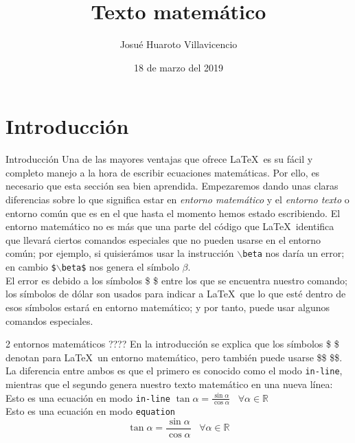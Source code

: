 \documentclass{beamer}
\institute{\vskip1ex Facultad de Ingeniería Mecánica\\ \vskip-1ex Universidad Nacional de Ingeniería}
\title{\huge Texto matemático}
\author[HeNeos]{\large Josué Huaroto Villavicencio}
\date{\tiny 18 de marzo del 2019}
\begin{document}
\begin{frame}
\maketitle
\end{frame}
\section{Introducción}
\begin{frame}{Introducción}
Una de las mayores ventajas que ofrece \LaTeX\, es su fácil y completo manejo a la hora de escribir ecuaciones matemáticas. Por ello, es necesario que esta sección sea bien aprendida. Empezaremos dando unas claras diferencias sobre lo que significa estar en \textit{entorno matemático} y el \textit{entorno texto} o entorno común que es en el que hasta el momento hemos estado escribiendo. El entorno matemático no es más que una parte del código que \LaTeX\, identifica que llevará ciertos comandos especiales que no pueden usarse en el entorno común; por ejemplo, si quisierámos usar la instrucción \texttt{$\backslash$beta} nos daría un error; en cambio \texttt{\$$\backslash$beta\$} nos genera el símbolo $\beta$.\\
El error es debido a los símbolos \$ \$ entre los que se encuentra nuestro comando; los símbolos de dólar son usados para indicar a \LaTeX\, que lo que esté dentro de esos símbolos estará en entorno matemático; y por tanto, puede usar algunos comandos especiales.
\end{frame}
\begin{frame}{2 entornos matemáticos ????}
En la introducción se explica que los símbolos \$ \$ denotan para \LaTeX\, un entorno matemático, pero también puede usarse \$\$ \$\$. La diferencia entre ambos es que el primero es conocido como el modo \texttt{in-line}, mientras que el segundo genera nuestro texto matemático en una nueva línea:\\[20pt]
Esto es una ecuación en modo \texttt{in-line} $\tan \alpha = \frac{\sin \alpha}{\cos \alpha} \;\;\; \forall \alpha \in \mathbb{R} $\\[20pt]
Esto es una ecuación en modo \texttt{equation}
$$
\tan \alpha = \frac{\sin \alpha}{\cos \alpha} \;\;\; \forall \alpha \in \mathbb{R}
$$
\end{frame}
\end{document}
